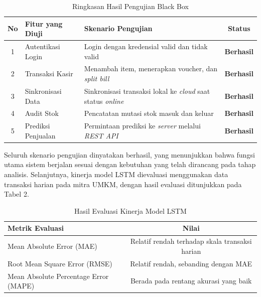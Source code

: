 \documentclass[a4paper,10pt,onecolumn]{article}
\begin{document}
\begin{table}[H]
\centering
\caption{Ringkasan Hasil Pengujian Black Box}
\label{tab:blackbox}
\fontsize{9pt}{11pt}\selectfont
\begin{tabularx}{\linewidth}{|c|>{\raggedright\arraybackslash}p{3.4cm}|>{\raggedright\arraybackslash}X|c|}
\hline
\textbf{No} & \textbf{Fitur yang Diuji} & \textbf{Skenario Pengujian} & \textbf{Status} \\
\hline
1 & Autentikasi Login & Login dengan kredensial valid dan tidak valid & \textbf{Berhasil} \\
\hline
2 & Transaksi Kasir & Menambah item, menerapkan voucher, dan \textit{split bill} & \textbf{Berhasil} \\
\hline
3 & Sinkronisasi Data & Sinkronisasi transaksi lokal ke \textit{cloud} saat status \textit{online} & \textbf{Berhasil} \\
\hline
4 & Audit Stok & Pencatatan mutasi stok masuk dan keluar & \textbf{Berhasil} \\
\hline
5 & Prediksi Penjualan & Permintaan prediksi ke \textit{server} melalui \textit{REST API} & \textbf{Berhasil} \\
\hline
\end{tabularx}
\end{table}

Seluruh skenario pengujian dinyatakan berhasil, yang menunjukkan bahwa fungsi utama sistem berjalan sesuai dengan kebutuhan yang telah dirancang pada tahap analisis. Selanjutnya, kinerja model LSTM dievaluasi menggunakan data transaksi harian pada mitra UMKM, dengan hasil evaluasi ditunjukkan pada Tabel 2.

\begin{table}[H]
\centering
\caption{Hasil Evaluasi Kinerja Model LSTM}
\label{tab:evaluasi}
\fontsize{9pt}{11pt}\selectfont
\begin{tabular}{|l|c|}
\hline
\textbf{Metrik Evaluasi} & \textbf{Nilai} \\
\hline
Mean Absolute Error (MAE) & Relatif rendah terhadap skala transaksi harian \\
\hline
Root Mean Square Error (RMSE) & Relatif rendah, sebanding dengan MAE \\
\hline
Mean Absolute Percentage Error (MAPE) & Berada pada rentang akurasi yang baik \\
\hline
\end{tabular}
\end{table}
\end{document}
